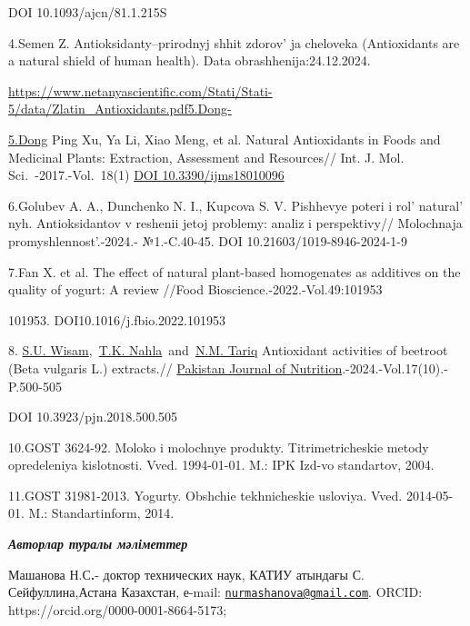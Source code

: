 DOI 10.1093/ajcn/81.1.215S

4.Semen Z. Antioksidanty--prirodnyj shhit zdorov' ja
cheloveka (Antioxidants are a natural shield of human health). Data
obrashhenija:24.12.2024.

\url{https://www.netanyascientific.com/Stati/Stati-5/data/Zlatin_Antioxidants.pdf5.Dong-}

\href{https://www.netanyascientific.com/Stati/Stati-5/data/Zlatin_Antioxidants.pdf5.Dong-5.Dong}{5.Dong}
Ping Xu, Ya Li, Xiao Meng, et al. Natural Antioxidants in Foods and
Medicinal Plants: Extraction, Assessment and Resources// Int. J. Mol.
Sci\emph{.}~-2017.-Vol.~18(1)
\href{https://doi.org/10.3390/ijms18010096}{DOI 10.3390/ijms18010096}

6.Golubev A. A., Dunchenko N. I., Kupcova S. V. Pishhevye poteri i
rol'{} natural' nyh. Antioksidantov v
reshenii jetoj problemy: analiz i perspektivy// Molochnaja
promyshlennost'.-2024.- №1.-C.40-45. DOI
10.21603/1019-8946-2024-1-9

7.Fan X. et al. The effect of natural plant-based homogenates as
additives on the quality of yogurt: A review //Food
Bioscience.-2022.-Vol.49:101953

101953. DOI10.1016/j.fbio.2022.101953

8.
\href{https://ascidatabase.com/author.php?ascicat=ALL&author=S.U.&mid=&last=Wisam}{S.U.
Wisam},~\href{https://ascidatabase.com/author.php?ascicat=ALL&author=T.K.&mid=&last=Nahla}{T.K.
Nahla}~and~\href{https://ascidatabase.com/author.php?ascicat=ALL&author=N.M.&mid=&last=Tariq}{N.M.
Tariq} Antioxidant activities of beetroot (Beta vulgaris L.) extracts.//
\href{https://www.researchgate.net/journal/Pakistan-Journal-of-Nutrition-1680-5194?_tp=eyJjb250ZXh0Ijp7ImZpcnN0UGFnZSI6InB1YmxpY2F0aW9uIiwicGFnZSI6InB1YmxpY2F0aW9uIn19}{Pakistan
Journal of Nutrition}.-2024.-Vol.17(10).-P.500-505~

DOI 10.3923/pjn.2018.500.505

10.GOST 3624-92. Moloko i molochnye produkty. Titrimetricheskie metody
opredeleniya kislotnosti. Vved. 1994-01-01. M.: IPK Izd-vo standartov,
2004.

11.GOST 31981-2013. Yogurty. Obshchie tekhnicheskie usloviya. Vved.
2014-05-01. M.: Standartinform, 2014.

\emph{{\bfseries Авторлар туралы мәліметтер}}

Машанова Н.С{\bfseries .}- доктор технических наук, КАТИУ атындағы С.
Сейфуллина,Астана Казахстан, е-mail:
\href{mailto:nurmashanova@gmail.com}{\nolinkurl{nurmashanova@gmail.com}}.
ORCID: https://orcid.org/0000-0001-8664-5173;

